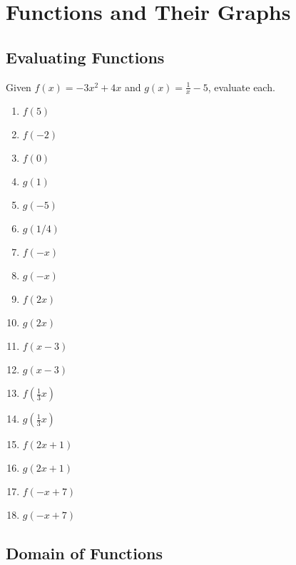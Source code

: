 \chapter{Functions and Their Graphs}

\section{Evaluating Functions}

Given $f(x) = -3x^2 + 4x$ and $g(x) = \frac{1}{x}-5$, evaluate each.
\begin{multicols}{3}
\begin{enumerate}
	\item $f(5)$
	\item $f(-2)$
	\item $f(0)$
	\item $g(1)$
	\item $g(-5)$
	\item $g(1/4)$
	\item $f(-x)$
	\item $g(-x)$
	\item $f(2x)$
	\item $g(2x)$
	\item $f(x-3)$
	\item $g(x-3)$
	\item $f\left(\frac{1}{3}x\right)$
	\item $g\left(\frac{1}{3}x\right)$
	\item $f(2x+1)$
	\item $g(2x+1)$
	\item $f(-x+7)$
	\item $g(-x+7)$
\end{enumerate}
\end{multicols}

\section{Domain of Functions}

